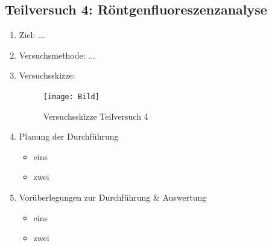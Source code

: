 \documentclass{article}
\begin{document}
\subsection{Teilversuch 4: Röntgenfluoreszenzanalyse}
\begin{enumerate}[label = (\Roman*)]
    \item Ziel: ...
    
    \item Versuchsmethode: ...
    
    \item Versuchsskizze:
    
        \begin{figure}[H]
        \centering
        \texttt{[image: Bild]}
        \caption{Versuchsskizze Teilversuch 4}
        \end{figure}

    \item Planung der Durchführung
        \begin{itemize}
            \item eins
            \item zwei
        \end{itemize}

    \item Vorüberlegungen zur Durchführung \& Auswertung
        \begin{itemize}
            \item eins
            \item zwei
        \end{itemize}
    
\end{enumerate}


\newpage
\end{document}
